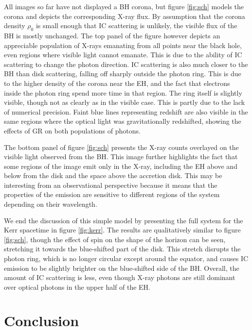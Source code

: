 \documentclass[twocolumn,twocolappendix]{aastex631}
\begin{document}
All images so far have not displayed a BH corona, but figure \ref{fig:sch} models the corona and depicts the corresponding X-ray flux. By assumption that the corona density $\rho_0$ is small enough that IC scattering is unlikely, the visible flux of the BH is mostly unchanged. The top panel of the figure however depicts an appreciable population of X-rays emanating from all points near the black hole, even regions where visible light cannot emanate. This is due to the ability of IC scattering to change the photon direction. IC scattering is also much closer to the BH than disk scattering, falling off sharply outside the photon ring. This is due to the higher density of the corona near the EH, and the fact that electrons inside the photon ring spend more time in that region. The ring itself is slightly visible, though not as clearly as in the visible case. This is partly due to the lack of numerical precision. Faint blue lines representing redshift are also visible in the same regions where the optical light was gravitationally redshifted, showing the effects of GR on both populations of photons.

The bottom panel of figure \ref{fig:sch} presents the X-ray counts overlayed on the visible light observed from the BH. This image further highlights the fact that some regions of the image emit only in the X-ray, including the EH above and below from the disk and the space above the accretion disk. This may be interesting from an observational perspective because it means that the properties of the emission are sensitive to different regions of the system depending on their wavelength.
    
We end the discussion of this simple model by presenting the full system for the Kerr spacetime in figure \ref{fig:kerr}. The results are qualitatively similar to figure \ref{fig:sch}, though the effect of spin on the shape of the horizon can be seen, stretching it towards the blue-shifted part of the disk. This stretch disrupts the photon ring, which is no longer circular except around the equator, and causes IC emission to be slightly brighter on the blue-shifted side of the BH. Overall, the amount of IC scattering is less, even though X-ray photons are still dominant over optical photons in the upper half of the EH.

\section{Conclusion}
\end{document}
